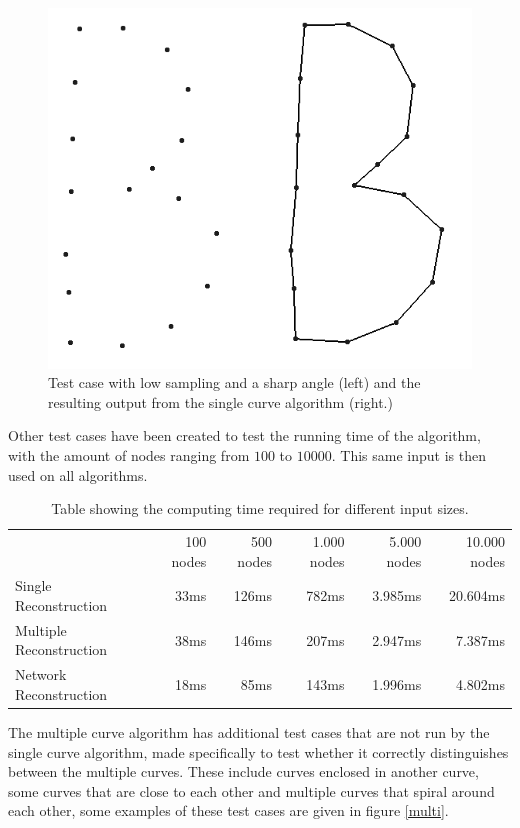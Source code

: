 \documentclass[11pt]{article}
\begin{document}
\begin{figure}[ht!]
\centering
\includegraphics[scale=0.2]{anglesamplerate.png}
\caption{Test case with low sampling and a sharp angle (left) and the resulting output from the single curve algorithm (right.)}
\label{single}
\end{figure}

Other test cases have been created to test the running time of the algorithm, with the amount of nodes ranging from $100$ to $10000$. This same input is then used on all algorithms.

\begin{table}[ht!]
    \begin{tabular}{lrrrrr}
    ~                       & 100 nodes & 500 nodes & 1.000 nodes & 5.000 			nodes & 10.000 nodes \\
    Single Reconstruction   & 33ms      & 126ms     & 782ms       & 3.985ms     	& 20.604ms     \\
    Multiple Reconstruction & 38ms      & 146ms     & 207ms       & 2.947ms     	& 7.387ms      \\
    Network Reconstruction  & 18ms      & 85ms      & 143ms       & 1.996ms     	& 4.802ms      \\
    \end{tabular}
\caption{Table showing the computing time required for different input sizes.}
\end{table}

The multiple curve algorithm has additional test cases that are not run by the single curve algorithm, made specifically to test whether it correctly distinguishes between the multiple curves. These include curves enclosed in another curve, some curves that are close to each other and multiple curves that spiral around each other, some examples of these test cases are given in figure \ref{multi}.
\end{document}
